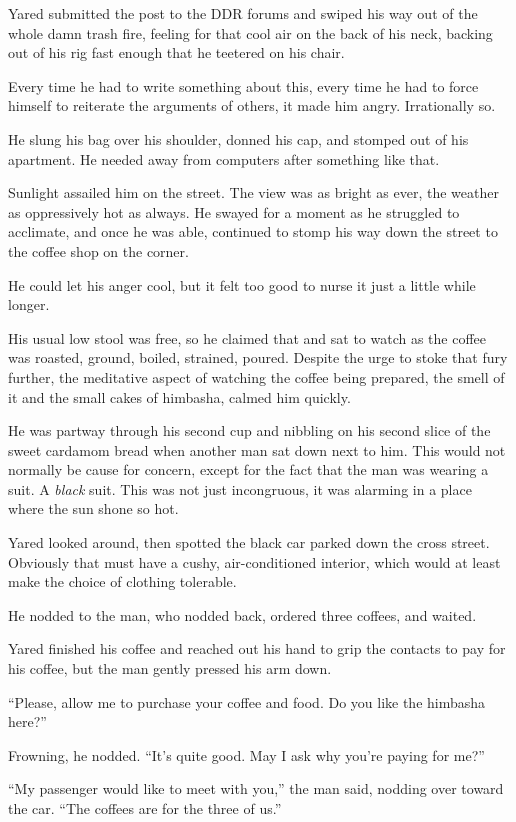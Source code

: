 \noindent Yared submitted the post to the DDR forums and swiped his way out of the whole damn trash fire, feeling for that cool air on the back of his neck, backing out of his rig fast enough that he teetered on his chair.

Every time he had to write something about this, every time he had to force himself to reiterate the arguments of others, it made him angry. Irrationally so.

He slung his bag over his shoulder, donned his cap, and stomped out of his apartment. He needed away from computers after something like that.

Sunlight assailed him on the street. The view was as bright as ever, the weather as oppressively hot as always. He swayed for a moment as he struggled to acclimate, and once he was able, continued to stomp his way down the street to the coffee shop on the corner.

He could let his anger cool, but it felt too good to nurse it just a little while longer.

His usual low stool was free, so he claimed that and sat to watch as the coffee was roasted, ground, boiled, strained, poured. Despite the urge to stoke that fury further, the meditative aspect of watching the coffee being prepared, the smell of it and the small cakes of himbasha, calmed him quickly.

He was partway through his second cup and nibbling on his second slice of the sweet cardamom bread when another man sat down next to him. This would not normally be cause for concern, except for the fact that the man was wearing a suit. A \emph{black} suit. This was not just incongruous, it was alarming in a place where the sun shone so hot.

Yared looked around, then spotted the black car parked down the cross street. Obviously that must have a cushy, air-conditioned interior, which would at least make the choice of clothing tolerable.

He nodded to the man, who nodded back, ordered three coffees, and waited.

Yared finished his coffee and reached out his hand to grip the contacts to pay for his coffee, but the man gently pressed his arm down.

``Please, allow me to purchase your coffee and food. Do you like the himbasha here?''

Frowning, he nodded. ``It's quite good. May I ask why you're paying for me?''

``My passenger would like to meet with you,'' the man said, nodding over toward the car. ``The coffees are for the three of us.''

